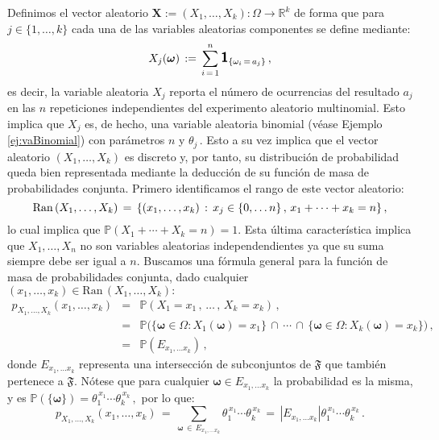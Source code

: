 \documentclass[spanish,10pt,letterpaper]{article}
\newcommand{\prob}{\mathbb{P}}
\newcommand{\Runo}{\mathbb{R}}
\newcommand{\indic}{\textbf{\textsf{\large{1}}}}
\begin{document}
\medskip 

Definimos el vector aleatorio $\mathbf{X}:=(X_1,\ldots,X_k):\Omega\rightarrow\Runo^k$ de forma que para $j\in\{1,\ldots,k\}$ cada una de las variables aleatorias componentes se define mediante:
\begin{equation}\label{eq:vecmultinom}
    X_j(\boldsymbol{\omega}) \,:=\, \sum_{i\,=\,1}^n\indic_{\{\omega_i\,=\,a_j\}}\,,
\end{equation}
es decir, la variable aleatoria $X_j$ reporta el número de ocurrencias del resultado $a_j$ en las $n$ repeticiones independientes del experimento aleatorio multinomial. Esto implica que $X_j$ es, de hecho, una variable aleatoria binomial (véase Ejemplo \ref{ej:vaBinomial}) con parámetros $n$ y $\theta_j\,.$ Esto a su vez implica que el vector aleatorio $(X_1,\ldots,X_k)$ es discreto y, por tanto, su distribución de probabilidad queda bien representada mediante la deducción de su función de masa de probabilidades conjunta. Primero identificamos el rango de este vector aleatorio:
\begin{equation}
    \text{Ran\,}(X_1,\ldots,X_k) \,=\, \{(x_1,\ldots,x_k)\,:\,x_j\in\{0,\ldots n\}\,,\, x_1+\cdots +x_k=n\}\,,
\end{equation}
lo cual implica que $\prob(X_1+\cdots +X_k=n)=1.$ Esta última característica implica que $X_1,\ldots,X_n$ no son variables aleatorias independendientes ya que su suma siempre debe ser igual a $n.$ Buscamos una fórmula general para la función de masa de probabilidades conjunta, dado cualquier $(x_1,\ldots,x_k)\in\text{Ran}\,(X_1,\ldots,X_k):$
\begin{eqnarray}\label{eq:fmpmultinom1}
    p_{X_1,\ldots,X_k}(x_1,\ldots,x_k) &=& \prob(X_1=x_1\,,\,\ldots\,,\,X_k=x_k)\,, \nonumber \\
    &=& \prob\big(\{\boldsymbol{\omega}\in\Omega:X_1(\boldsymbol{\omega})=x_1\}\,\cap\,\cdots\,\cap\,\{\boldsymbol{\omega}\in\Omega:X_k(\boldsymbol{\omega})=x_k\}\big)\,, \nonumber \\ 
    &=& \prob(E_{x_1,\ldots x_k})\,,
\end{eqnarray}
donde $E_{x_1,\ldots x_k}$ representa una intersección de subconjuntos de $\mathfrak{F}$ que también pertenece a $\mathfrak{F}.$ Nótese que para cualquier $\boldsymbol{\omega}\in E_{x_1,\ldots x_k}$ la probabilidad es la misma, y es $\prob(\{\boldsymbol{\omega}\})=\theta_1^{\,x_1}\cdots\theta_k^{\,x_k}\,,$ por lo que:
\begin{equation}\label{eq:fmpmulti}
    p_{X_1,\ldots,X_k}(x_1,\ldots,x_k) \,=\, \sum_{\boldsymbol{\omega}\,\in\, E_{x_1,\ldots x_k}}\!\!\!\!\!\!\theta_1^{\,x_1}\cdots\theta_k^{\,x_k} \,=\,|E_{x_1,\ldots x_k}|\theta_1^{\,x_1}\cdots\theta_k^{\,x_k}\,.
\end{equation}
\end{document}
